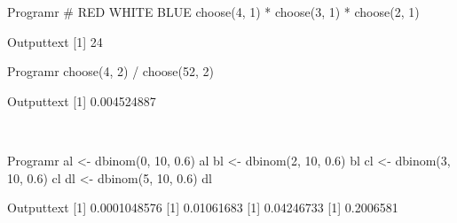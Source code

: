 \graphicspath{{../figures/assignment5/}}

\begin{code}
    {Program}{r}
#    RED           WHITE          BLUE
choose(4, 1) * choose(3, 1) * choose(2, 1)
\end{code}
\begin{code}
    {Output}{text}
[1] 24
\end{code}

\begin{code}
    {Program}{r}
choose(4, 2) / choose(52, 2)
\end{code}
\begin{code}
    {Output}{text}
[1] 0.004524887
\end{code}

~
\begin{code}
    {Program}{r}
al <- dbinom(0, 10, 0.6)
al
bl <- dbinom(2, 10, 0.6)
bl
cl <- dbinom(3, 10, 0.6)
cl
dl <- dbinom(5, 10, 0.6)
dl
\end{code}
\begin{code}
    {Output}{text}
[1] 0.0001048576
[1] 0.01061683
[1] 0.04246733
[1] 0.2006581
\end{code}
\newpage
\pagestyle{fancy}

